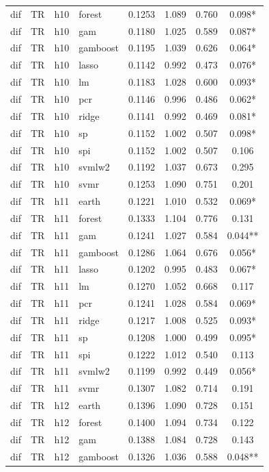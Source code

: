 \begin{ThreePartTable}
\begin{longtable}[t]{llclcccc}
dif & TR & h10 & forest & 0.1253 & 1.089 & 0.760 & 0.098*\\
dif & TR & h10 & gam & 0.1180 & 1.025 & 0.589 & 0.087*\\
dif & TR & h10 & gamboost & 0.1195 & 1.039 & 0.626 & 0.064*\\
dif & TR & h10 & lasso & 0.1142 & 0.992 & 0.473 & 0.076*\\
dif & TR & h10 & lm & 0.1183 & 1.028 & 0.600 & 0.093*\\
dif & TR & h10 & pcr & 0.1146 & 0.996 & 0.486 & 0.062*\\
dif & TR & h10 & ridge & 0.1141 & 0.992 & 0.469 & 0.081*\\
dif & TR & h10 & sp & 0.1152 & 1.002 & 0.507 & 0.098*\\
dif & TR & h10 & spi & 0.1152 & 1.002 & 0.507 & 0.106\\
dif & TR & h10 & svmlw2 & 0.1192 & 1.037 & 0.673 & 0.295\\
dif & TR & h10 & svmr & 0.1253 & 1.090 & 0.751 & 0.201\\
\addlinespace
dif & TR & h11 & earth & 0.1221 & 1.010 & 0.532 & 0.069*\\
dif & TR & h11 & forest & 0.1333 & 1.104 & 0.776 & 0.131\\
dif & TR & h11 & gam & 0.1241 & 1.027 & 0.584 & 0.044**\\
dif & TR & h11 & gamboost & 0.1286 & 1.064 & 0.676 & 0.056*\\
dif & TR & h11 & lasso & 0.1202 & 0.995 & 0.483 & 0.067*\\
dif & TR & h11 & lm & 0.1270 & 1.052 & 0.668 & 0.117\\
dif & TR & h11 & pcr & 0.1241 & 1.028 & 0.584 & 0.069*\\
dif & TR & h11 & ridge & 0.1217 & 1.008 & 0.525 & 0.093*\\
dif & TR & h11 & sp & 0.1208 & 1.000 & 0.499 & 0.095*\\
dif & TR & h11 & spi & 0.1222 & 1.012 & 0.540 & 0.113\\
dif & TR & h11 & svmlw2 & 0.1199 & 0.992 & 0.449 & 0.056*\\
dif & TR & h11 & svmr & 0.1307 & 1.082 & 0.714 & 0.191\\
\addlinespace
dif & TR & h12 & earth & 0.1396 & 1.090 & 0.728 & 0.151\\
dif & TR & h12 & forest & 0.1400 & 1.094 & 0.734 & 0.122\\
dif & TR & h12 & gam & 0.1388 & 1.084 & 0.728 & 0.143\\
dif & TR & h12 & gamboost & 0.1326 & 1.036 & 0.588 & 0.048**\\

\end{longtable}
\end{ThreePartTable}

